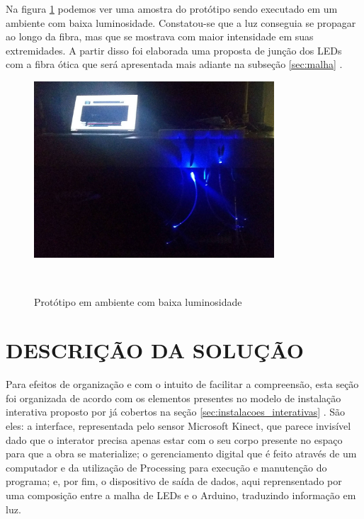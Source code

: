 Na figura \ref{fig:prototipo_escuro} podemos ver uma amostra do protótipo sendo executado em um ambiente com baixa luminosidade. Constatou-se que a luz conseguia se propagar ao longo da fibra, mas que se mostrava com maior intensidade em suas extremidades. A partir disso foi elaborada uma proposta de junção dos LEDs com a fibra ótica que será apresentada mais adiante na subseção \ref{sec:malha} .

\begin{figure}[H]
  \begin{center}
    \caption{Protótipo em ambiente com baixa luminosidade}
    \vspace*{0,2cm}
    \includegraphics[width=0.8\textwidth]{./04-figuras/prototipo_escuro}
    \label{fig:prototipo_escuro}
  \end{center}
  \vspace*{-0,9cm}
  \\
\end{figure}

\section{DESCRIÇÃO DA SOLUÇÃO}
\label{sec:solucao}

Para efeitos de organização e com o intuito de facilitar a compreensão, esta seção foi organizada de acordo com os elementos presentes no modelo de instalação interativa proposto por \cite{sogabe2011} já cobertos na seção \ref{sec:instalacoes_interativas} . São eles: a interface, representada pelo sensor Microsoft Kinect, que parece invisível dado que o interator precisa apenas estar com o seu corpo presente no espaço para que a obra se materialize; o gerenciamento digital que é feito através de um computador e da utilização de Processing para execução e manutenção do programa; e, por fim, o dispositivo de saída de dados, aqui reprensentado por uma composição entre a malha de LEDs e o Arduino, traduzindo informação em luz.

